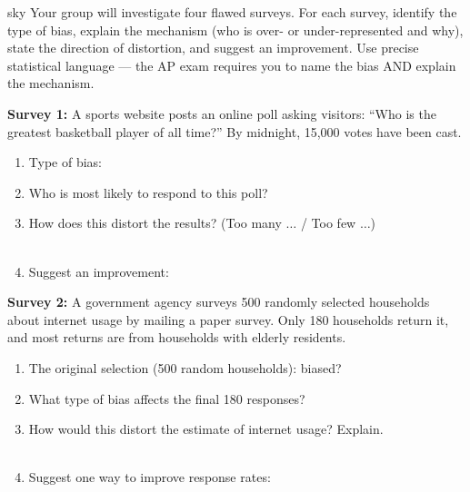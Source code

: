 \documentclass[10pt]{article}
\begin{document}
\namepartnerperiod

\vspace{0.1in}

\begin{scenariobox}[Context]{sky}
\small
Your group will investigate four flawed surveys. For each survey, identify the type
of bias, explain the mechanism (who is over- or under-represented and why), state the
direction of distortion, and suggest an improvement. Use precise statistical
language --- the AP exam requires you to name the bias AND explain the mechanism.
\end{scenariobox}

\vspace{0.1in}

\textbf{Survey 1:} A sports website posts an online poll asking visitors: ``Who is
the greatest basketball player of all time?'' By midnight, 15{,}000 votes have
been cast.

\begin{practicebox}
\small
\begin{enumerate}[leftmargin=1.5em, itemsep=8pt]
  \item Type of bias: \blank{7cm}
  \item Who is most likely to respond to this poll? \blank{8cm}
  \item How does this distort the results? (Too many $\ldots$ / Too few $\ldots$)\\
        \writeline\\[1pt]\writeline
  \item Suggest an improvement: \blank{9cm}
\end{enumerate}
\end{practicebox}

\vspace{0.1in}

\textbf{Survey 2:} A government agency surveys 500 randomly selected households
about internet usage by mailing a paper survey. Only 180 households return it, and
most returns are from households with elderly residents.

\begin{practicebox}
\small
\begin{enumerate}[leftmargin=1.5em, itemsep=8pt]
  \item The original selection (500 random households): biased? \blank{3cm}
  \item What type of bias affects the final 180 responses? \blank{5cm}
  \item How would this distort the estimate of internet usage? Explain.\\
        \writeline\\[1pt]\writeline
  \item Suggest one way to improve response rates: \blank{9cm}
\end{enumerate}
\end{practicebox}
\end{document}
